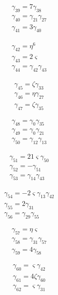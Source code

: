 \[\begin{aligned}\gamma_{39}=7 \gamma_{38}\\ \gamma_{40}=\gamma_{21} \gamma_{27}\\ \gamma_{41}=3 \gamma_{40}\end{aligned}\]

\[\begin{aligned}\gamma_{42}=\eta ^{6}\\ \gamma_{43}=2 \varsigma \\ \gamma_{44}=\gamma_{42} \gamma_{43}\end{aligned}\]

\[\begin{aligned}\gamma_{45}=\zeta  \gamma_{33}\\ \gamma_{46}=\eta  \gamma_{27}\\ \gamma_{47}=\zeta  \gamma_{35}\end{aligned}\]

\[\begin{aligned}\gamma_{48}=\gamma_{0} \gamma_{35}\\ \gamma_{49}=\gamma_{0} \gamma_{21}\\ \gamma_{50}=\gamma_{12} \gamma_{13}\end{aligned}\]

\[\begin{aligned}\gamma_{51}=21 \varsigma  \gamma_{50}\\ \gamma_{52}=- \gamma_{51}\\ \gamma_{53}=\gamma_{14} \gamma_{43}\end{aligned}\]

\[\begin{aligned}\gamma_{54}=- 2 \varsigma  \gamma_{13} \gamma_{42}\\ \gamma_{55}=2 \gamma_{31}\\ \gamma_{56}=\gamma_{29} \gamma_{55}\end{aligned}\]

\[\begin{aligned}\gamma_{57}=\eta  \varsigma \\ \gamma_{58}=\gamma_{31} \gamma_{57}\\ \gamma_{59}=4 \gamma_{58}\end{aligned}\]

\[\begin{aligned}\gamma_{60}=\varsigma  \gamma_{42}\\ \gamma_{61}=4 \zeta  \gamma_{60}\\ \gamma_{62}=\varsigma  \gamma_{31}\end{aligned}\]

